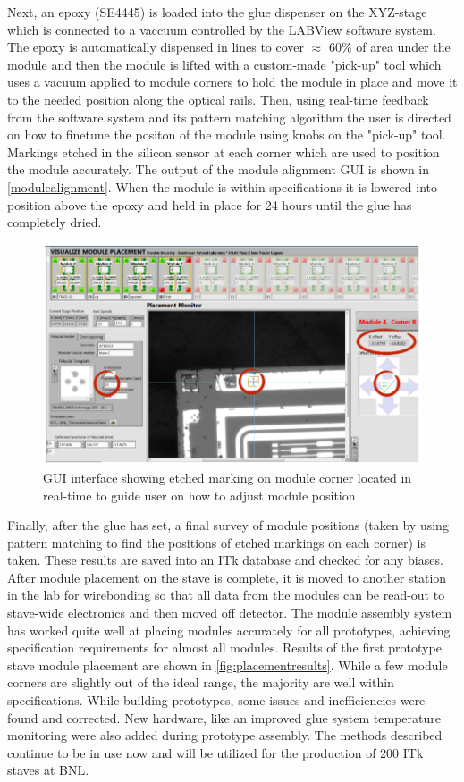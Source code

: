 Next, an epoxy (SE4445) is loaded into the glue dispenser on the XYZ-stage which is connected to a vaccuum controlled by the LABView software system. The epoxy is automatically dispensed in lines to cover $\approx$ 60\% of area under the module and then the module is lifted with a custom-made "pick-up" tool which uses a vacuum applied to module corners to hold the module in place and move it to the needed position along the optical rails. Then, using real-time feedback from the software system and its pattern matching algorithm the user is directed on how to finetune the positon of the module using knobs on the "pick-up" tool. Markings etched in the silicon sensor at each corner which are used to position the module accurately. The output of the module alignment GUI is shown in \ref{modulealignment}. When the module is within specifications it is lowered into position above the epoxy and held in place for 24 hours until the glue has completely dried.

\begin{figure}[!h]
        \centering
    \includegraphics[width=.6\textwidth]{Pictures/labviewscreen.png}
    \caption{GUI interface showing etched marking on module corner located in real-time to guide user on how to adjust module position}
    \label{fig:modulealignment}
\end{figure}

Finally, after the glue has set, a final survey of module positions (taken by using pattern matching to find the positions of etched markings on each corner) is taken. These results are saved into an ITk database and checked for any biases. After module placement on the stave is complete, it is moved to another station in the lab for wirebonding so that all data from the modules can be read-out to stave-wide electronics and then moved off detector. The module assembly system has worked quite well at placing modules accurately for all prototypes, achieving specification requirements for almost all modules. Results of the first prototype stave module placement are shown in \ref{fig:placementresults}. While a few module corners are slightly out of the ideal range, the majority are well within specifications. While building prototypes, some issues and inefficiencies were found and corrected. New hardware, like an improved glue system temperature monitoring were also added during prototype assembly. The methods described continue to be in use now and will be utilized for the production of 200 ITk staves at BNL. 

